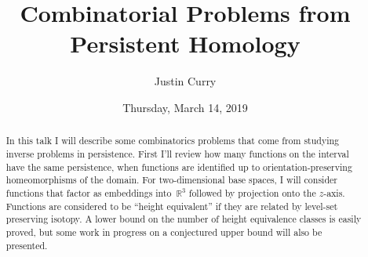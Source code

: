 \documentclass{UAmathtalk}
\author{Justin Curry}
\title{Combinatorial Problems from\\ Persistent Homology}
\date{Thursday, March 14, 2019}
\begin{document}
\maketitle

\begin{abstract}
In this talk I will describe some combinatorics problems that come from studying inverse problems in persistence. First I'll review how many functions on the interval have the same persistence, when functions are identified up to orientation-preserving homeomorphisms of the domain. For two-dimensional base spaces, I will consider functions that factor as embeddings into~$\mathbb{R}^3$ followed by projection onto the $z$-axis. Functions are considered to be ``height equivalent'' if they are related by level-set preserving isotopy. A lower bound on the number of height equivalence classes is easily proved, but some work in progress on a conjectured upper bound will also be presented.
\end{abstract}
\end{document}
